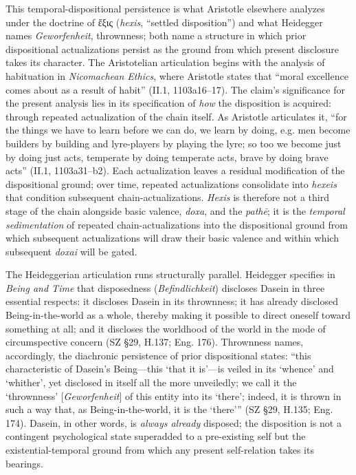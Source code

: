 \documentclass{article}
\begin{document}
This temporal-dispositional persistence is what Aristotle elsewhere analyzes under the doctrine of ἕξις (\textit{hexis}, ``settled disposition'') and what Heidegger names \textit{Geworfenheit}, thrownness; both name a structure in which prior dispositional actualizations persist as the ground from which present disclosure takes its character. The Aristotelian articulation begins with the analysis of habituation in \textit{Nicomachean Ethics}, where Aristotle states that ``moral excellence comes about as a result of habit'' (II.1, 1103a16--17). The claim's significance for the present analysis lies in its specification of \textit{how} the disposition is acquired: through repeated actualization of the chain itself. As Aristotle articulates it, ``for the things we have to learn before we can do, we learn by doing, e.g. men become builders by building and lyre-players by playing the lyre; so too we become just by doing just acts, temperate by doing temperate acts, brave by doing brave acts'' (II.1, 1103a31--b2). Each actualization leaves a residual modification of the dispositional ground; over time, repeated actualizations consolidate into \textit{hexeis} that condition subsequent chain-actualizations. \textit{Hexis} is therefore not a third stage of the chain alongside basic valence, \textit{doxa}, and the \textit{path\=e}; it is the \textit{temporal sedimentation} of repeated chain-actualizations into the dispositional ground from which subsequent actualizations will draw their basic valence and within which subsequent \textit{doxai} will be gated.

The Heideggerian articulation runs structurally parallel. Heidegger specifies in \textit{Being and Time} that disposedness (\textit{Befindlichkeit}) discloses Dasein in three essential respects: it discloses Dasein in its thrownness; it has already disclosed Being-in-the-world as a whole, thereby making it possible to direct oneself toward something at all; and it discloses the worldhood of the world in the mode of circumspective concern (SZ \S29, H.137; Eng. 176). Thrownness names, accordingly, the diachronic persistence of prior dispositional states: ``this characteristic of Dasein's Being---this `that it is'---is veiled in its `whence' and `whither', yet disclosed in itself all the more unveiledly; we call it the `thrownness' [\textit{Geworfenheit}] of this entity into its `there'; indeed, it is thrown in such a way that, as Being-in-the-world, it is the `there''' (SZ \S29, H.135; Eng. 174). Dasein, in other words, is \textit{always already} disposed; the disposition is not a contingent psychological state superadded to a pre-existing self but the existential-temporal ground from which any present self-relation takes its bearings.
\end{document}
